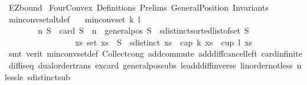 %
\begin{isabellebody}%
%
%
\isadelimtheory
%
\endisadelimtheory
%
\isatagtheory
{}\isamarkupfalse%
\ EZ{\isacharunderscore}{\kern0pt}bound\isanewline
{}\ Four{\isacharunderscore}{\kern0pt}Convex\ Definitions\ Prelims\ GeneralPosition{}\ Invariants\isanewline
{}%
\endisatagtheory
{\isafoldtheory}%
%
\isadelimtheory
\isanewline
%
\endisadelimtheory
\isanewline
\isanewline
\isanewline
{}\isamarkupfalse%
\ min{\isacharunderscore}{\kern0pt}conv{\isacharunderscore}{\kern0pt}set{\isacharunderscore}{\kern0pt}alt{\isacharunderscore}{\kern0pt}def{\isacharcolon}{\kern0pt}\isanewline
\ \ \ {\isachardoublequoteopen}min{\isacharunderscore}{\kern0pt}conv{\isacharunderscore}{\kern0pt}set\ k\ l\isanewline
\ \ \ \ \ \ \ \ {\isacharequal}{\kern0pt}\isanewline
\ \ \ \ \ \ \ \ {\isacharbraceleft}{\kern0pt}n{\isachardot}{\kern0pt}\ {\isasymforall}S\ {\isachardot}{\kern0pt}\ {\isacharparenleft}{\kern0pt}card\ S\ {\isacharequal}{\kern0pt}\ n\ {\isasymand}\ general{\isacharunderscore}{\kern0pt}pos\ S\ {\isasymand}\ sdistinct{\isacharparenleft}{\kern0pt}sorted{\isacharunderscore}{\kern0pt}list{\isacharunderscore}{\kern0pt}of{\isacharunderscore}{\kern0pt}set\ S{\isacharparenright}{\kern0pt}{\isacharparenright}{\kern0pt}\isanewline
\ \ \ \ \ \ \ \ \ \ \ \ \ \ \ \ {\isasymlongrightarrow}\ {\isacharparenleft}{\kern0pt}{\isasymexists}xs{\isachardot}{\kern0pt}\ set\ xs\ {\isasymsubseteq}\ S\ {\isasymand}\ sdistinct\ xs\ {\isasymand}\ {\isacharparenleft}{\kern0pt}cap\ k\ xs\ {\isasymor}\ cup\ l\ xs{\isacharparenright}{\kern0pt}{\isacharparenright}{\kern0pt}{\isacharbraceright}{\kern0pt}{\isachardoublequoteclose}\isanewline
%
\isadelimproof
\ \ %
\endisadelimproof
%
\isatagproof
{}\isamarkupfalse%
\ {\isacharparenleft}{\kern0pt}smt\ {\isacharparenleft}{\kern0pt}verit{\isacharparenright}{\kern0pt}\ min{\isacharunderscore}{\kern0pt}conv{\isacharunderscore}{\kern0pt}set{\isacharunderscore}{\kern0pt}def\ Collect{\isacharunderscore}{\kern0pt}cong\ add{\isachardot}{\kern0pt}commute\ add{\isacharunderscore}{\kern0pt}diff{\isacharunderscore}{\kern0pt}cancel{\isacharunderscore}{\kern0pt}left{\isacharprime}{\kern0pt}\ card{\isachardot}{\kern0pt}infinite\ diff{\isacharunderscore}{\kern0pt}is{\isacharunderscore}{\kern0pt}{}{\isacharunderscore}{\kern0pt}eq{\isacharprime}{\kern0pt}\ dual{\isacharunderscore}{\kern0pt}order{\isachardot}{\kern0pt}trans\ ex{\isacharunderscore}{\kern0pt}card\ general{\isacharunderscore}{\kern0pt}pos{\isacharunderscore}{\kern0pt}subs\ le{\isacharunderscore}{\kern0pt}add{\isacharunderscore}{\kern0pt}diff{\isacharunderscore}{\kern0pt}inverse\ linorder{\isacharunderscore}{\kern0pt}not{\isacharunderscore}{\kern0pt}less\ nless{\isacharunderscore}{\kern0pt}le\ sdistinct{\isacharunderscore}{\kern0pt}sub{\isacharparenright}{\kern0pt}%

\end{isabellebody}
